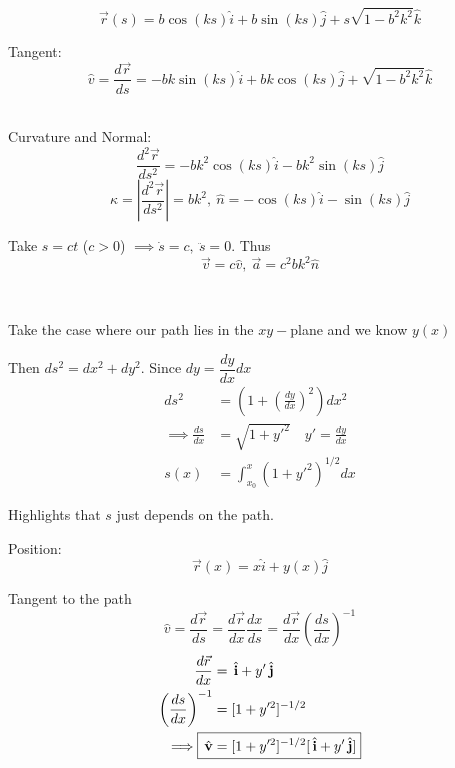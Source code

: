 \documentclass[10pt]{scrartcl}
\begin{document}
\pagebreak


\begin{example}
	\[\vec{r}(s) = b\cos(ks)\hat{i} + b\sin(ks)\hat{j} + s\sqrt{1-b^2k^2}\hat{k}\]
	
	Tangent:
	\[\hat{v} = \frac{d\vec{r}}{ds} = -bk\sin(ks)\hat{i} + bk\cos(ks)\hat{j} + \sqrt{1-b^2k^2}\hat{k}\]~
	
	Curvature and Normal:
	\[\frac{d^2\vec{r}}{ds^2} = -bk^2\cos(ks)\hat{i} -bk^2 \sin(ks)\hat{j}\]
	\[\kappa =\left|\frac{d^2\vec{r}}{ds^2}\right| = bk^2,~ \hat{n} =  -\cos(ks)\hat{i} -\sin(ks)\hat{j}\]
	
Take $s = ct$ ($c >0$) $ \implies \dot{s} =c,~ \ddot{s} = 0$. Thus
\[\vec{v} = c\hat{v},~\vec{a} = c^2bk^2\hat{n}\]	
\end{example}~

Take the case where our path lies in the $xy-$plane and we know $y(x)$
\begin{center}
\end{center}

Then $ds^2 = dx^2 + dy^2$. Since $dy = \dfrac{dy}{dx}dx$ 
\[\begin{aligned}
ds^2 &= \left(1 + \left(\frac{dy}{dx}\right)^2\right)dx^2\\
\implies \frac{ds}{dx} &= \sqrt{1 + y'^2}\quad y' = \frac{dy}{dx}\\
s(x) &= \int_{x_0}^x (1 + y'^2)^{1/2}dx
\end{aligned}\]

Highlights that $s$ just depends on the path. 


Position: \[\vec{r}(x) = x\hat{i} + y(x)\hat{j}\]

Tangent to the path
\[\hat{v} = \frac{d\vec{r}}{ds} = \frac{d\vec{r}}{dx}\frac{dx}{ds} = \frac{d\vec{r}}{dx}\left(\frac{ds}{dx}\right)^{-1}\]
\[\begin{aligned}
\frac{d\vec{r}}{dx} &= \hat{i} + y'\hat{j}\\
\left(\frac{ds}{dx}\right)^{-1} &= [1 + y'^2]^{-1/2}\\
\implies \Aboxed{\hat{v} &= [1+y'^2]^{-1/2}[\hat{i} + y'\hat{j}]}
\end{aligned}\]
\end{document}
